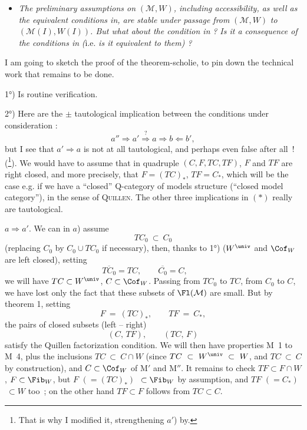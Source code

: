 \begin{itemize}[leftmargin=2.5em]

\item[\circled{4}] \textit{The preliminary assumptions on} $(\mathcal{M}, W)$\textit{, including accessibility, as well as the equivalent conditions in}\textit{, are stable under passage from} $(\mathcal{M}, W)$ \textit{to} $(\mathcal{M}(I), W(I))$\textit{. But what about the condition in} \textit{? Is it a consequence of the conditions in}  \textit{(}i.e. \textit{is it equivalent to them) ?} %
\end{itemize}

I am going to sketch the proof of the theorem-scholie, to pin down the technical work that remains to be done.

1°) Is routine verification.

2°) Here are the $\pm$ tautological implication between the conditions under consideration : %
\[ a'' \Longrightarrow a' \overset{?}{\Longrightarrow} a \Longrightarrow b \Longleftarrow b', \tag*{$(*)$} \]
but I see that $a' \Longrightarrow a$ is not at all tautological, and perhaps even false after all~! (\footnote[13]{That is why I modified it, strengthening $a'$) by.}). We would have to assume that in quadruple $(C,F,TC,TF)$, $F$ and $TF$ are right closed, and more precisely, that $F = (TC)_*$, $TF = C_*$, which will be the case e.g. if we have a ``closed'' Q-category of models structure (``closed model category''), in the sense of \textsc{Quillen}. The other three implications in $(*)$ really are tautological.

$a \Longrightarrow a'$. We can in $a$) assume
\[ TC_0 \ \subset\ C_0 \]
(replacing $C_0$ by $C_0 \cup TC_0$ if necessary), then, thanks to
1°) ($W^{\univ}$ and $\Cof_W$ are left closed), setting
\[ \overline{TC_0} = TC, \qquad \overline{C_0} = C, \qquad \]
we will have $TC \subset W^{\univ}$, $C \subset \Cof_W$. Passing from $TC_0$ to $TC$, from $C_0$ to $C$, we have lost only the fact that these subsets of $\Fl(\mathcal{M})$ are small. But by theorem 1, setting
\[ F \ =\ (TC)_*, \qquad TF \ =\ C_*, \]
the pairs of closed subsets (left -- right)
\[ (C,\, TF), \qquad (TC,\, F) \]
satisfy the Quillen factorization condition. We will then have properties M~1 to M~4, plus the inclusions $TC \ \subset\ C \cap W$ (since $TC \ \subset\ W^{\univ} \ \subset\ W$, and $TC \ \subset\ C$ by construction), and $C \subset \Cof_W$ of M$'$ and M$''$. It remains to check $TF \subset F \cap W$, $F \subset \Fib_W$, but $F$ $(= (TC)_*)$ $\ \subset \Fib_W$ by assumption, and $TF$ $(= C_*)$ $\ \subset W$ too~; on the other hand $TF \subset F$ follows from $TC \subset C$.


